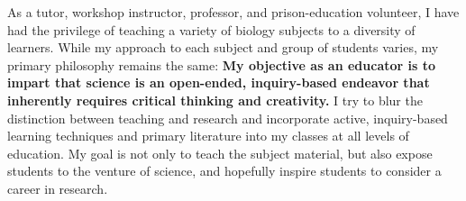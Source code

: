 \noindent
As a
tutor,
workshop instructor,
professor,
and
prison-education volunteer,
I have had the privilege of teaching a variety of biology subjects to a
diversity of learners.
While my approach to each subject and group of students varies, my primary
philosophy remains the same:
\textbf{My objective as an educator is to impart that
        science
        is an open-ended, inquiry-based endeavor that inherently requires
        critical thinking and creativity.}
I try to blur the distinction between teaching and research and incorporate
active, inquiry-based learning techniques and primary literature into my
classes at all levels of
education.
My goal is not only to teach the subject material, but also expose students to
the venture of science, and hopefully inspire students to consider a
career in research.

